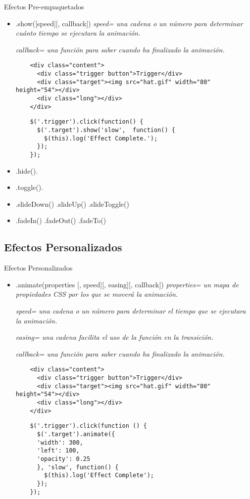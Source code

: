 \begin{frame}[fragile]{Efectos Pre-empaquetados} %
\begin{itemize}
    \item .show([speed][, callback]) \textit{ speed= una cadena o un número para determinar cuánto tiempo se ejecutara la animación.}

    \textit{callback= una función para saber cuando ha finalizado la animación.}
    \begin{lstlisting}
    <div class="content">
      <div class="trigger button">Trigger</div>
      <div class="target"><img src="hat.gif" width="80" height="54"></div>
      <div class="long"></div>
    </div>
    \end{lstlisting}
    \begin{lstlisting}
    $('.trigger').click(function() {
      $('.target').show('slow',  function() {
        $(this).log('Effect Complete.');
      });
    });
    \end{lstlisting}
    \item .hide().
    \item .toggle().
    \item .slideDown() .slideUp() .slideToggle()
    \item .fadeIn() .fadeOut() .fadeTo()
\end{itemize}
\end{frame}

\subsection{Efectos Personalizados} %

\begin{frame}[fragile]{Efectos Personalizados} %
\begin{itemize}
    \item .animate(properties [, speed][, easing][, callback])  \textit{
    properties= un mapa de propiedades CSS por los que se moverá la animación.}

    \textit{ speed= una cadena o un número para determinar el tiempo que se ejecutara la animación.}

    \textit{ easing= una cadena facilita el uso de la función en la transición.}

    \textit{ callback= una función para saber cuando ha finalizado la animación.}
    \begin{lstlisting}
    <div class="content">
      <div class="trigger button">Trigger</div>
      <div class="target"><img src="hat.gif" width="80" height="54"></div>
      <div class="long"></div>
    </div>
    \end{lstlisting}
    \begin{lstlisting}
    $('.trigger').click(function () {
      $('.target').animate({
      'width': 300, 
      'left': 100, 
      'opacity': 0.25
      }, 'slow', function() {
        $(this).log('Effect Complete');
      });  
    });
    \end{lstlisting}
\end{itemize}
\end{frame}

